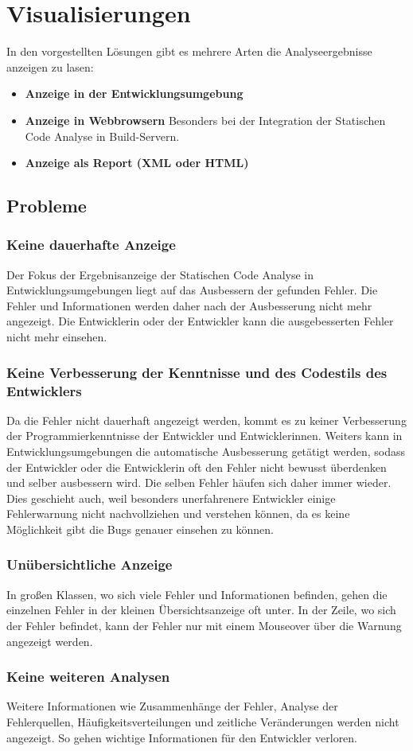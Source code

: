 \section{Visualisierungen} 
In den vorgestellten Lösungen gibt es mehrere Arten die Analyseergebnisse anzeigen zu lasen:
\begin{itemize}
\item \textbf{Anzeige in der Entwicklungsumgebung}
\item \textbf{Anzeige in Webbrowsern}
Besonders bei der Integration der Statischen Code Analyse in Build-Servern.
\item \textbf{Anzeige als Report (XML oder HTML)}
\end{itemize}
\subsection{Probleme} 

\subsubsection{Keine dauerhafte Anzeige} 
Der Fokus der Ergebnisanzeige der Statischen Code Analyse in Entwicklungsumgebungen liegt auf das Ausbessern der gefunden Fehler. Die Fehler und Informationen werden daher nach der Ausbesserung nicht mehr angezeigt. Die Entwicklerin oder der Entwickler kann die ausgebesserten Fehler nicht mehr einsehen.

\subsubsection{Keine Verbesserung der Kenntnisse und des Codestils des Entwicklers} 
Da die Fehler nicht dauerhaft angezeigt werden, kommt es zu keiner Verbesserung der Programmierkenntnisse der Entwickler und Entwicklerinnen. Weiters kann in Entwicklungsumgebungen die automatische Ausbesserung getätigt werden, sodass der Entwickler oder die Entwicklerin oft den Fehler nicht bewusst überdenken und selber ausbessern wird. 
Die selben Fehler häufen sich daher immer wieder. Dies geschieht auch, weil besonders unerfahrenere Entwickler einige Fehlerwarnung nicht nachvollziehen und verstehen können, da es keine Möglichkeit gibt die Bugs genauer einsehen zu können. 

\subsubsection{Unübersichtliche Anzeige} 
In großen Klassen, wo sich viele Fehler und Informationen befinden, gehen die einzelnen Fehler in der kleinen Übersichtsanzeige oft unter. In der Zeile, wo sich der Fehler befindet, kann der Fehler nur mit einem Mouseover über die Warnung angezeigt werden. 

\subsubsection{Keine weiteren Analysen}
Weitere Informationen wie Zusammenhänge der Fehler, Analyse der Fehlerquellen, Häufigkeitsverteilungen und zeitliche Veränderungen werden nicht angezeigt. So gehen wichtige Informationen für den Entwickler verloren.